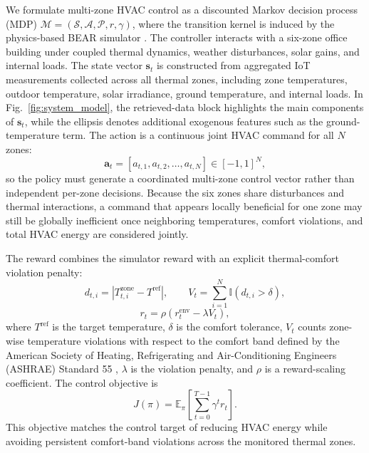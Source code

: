 ﻿\documentclass[conference]{IEEEtran}
\theoremstyle{nonumberplain}
\theoremstyle{plain}
\begin{document}
We formulate multi-zone HVAC control as a discounted Markov decision process (MDP) $\mathcal{M}=(\mathcal{S},\mathcal{A},\mathcal{P},r,\gamma)$, where the transition kernel is induced by the physics-based BEAR simulator \cite{zhang2023bear}. The controller interacts with a six-zone office building under coupled thermal dynamics, weather disturbances, solar gains, and internal loads. The state vector $\mathbf{s}_t$ is constructed from aggregated IoT measurements collected across all thermal zones, including zone temperatures, outdoor temperature, solar irradiance, ground temperature, and internal loads. In Fig.~\ref{fig:system_model}, the retrieved-data block highlights the main components of $\mathbf{s}_t$, while the ellipsis denotes additional exogenous features such as the ground-temperature term. The action is a continuous joint HVAC command for all $N$ zones:
\begin{equation}
    \mathbf{a}_t =
    [a_{t,1}, a_{t,2}, \dots, a_{t,N}]
    \in [-1,1]^N,
    \label{eq:action}
\end{equation}
so the policy must generate a coordinated multi-zone control vector rather than independent per-zone decisions. Because the six zones share disturbances and thermal interactions, a command that appears locally beneficial for one zone may still be globally inefficient once neighboring temperatures, comfort violations, and total HVAC energy are considered jointly.

The reward combines the simulator reward with an explicit thermal-comfort violation penalty:
\begin{equation}
    d_{t,i}=\left|T_{t,i}^{\mathrm{zone}}-T^{\mathrm{ref}}\right|,
    \qquad
    V_t=\sum_{i=1}^{N}\mathbb{I}(d_{t,i}>\delta),
    \label{eq:violation}
\end{equation}
\begin{equation}
    r_t = \rho \left( r_t^{\mathrm{env}} - \lambda V_t \right),
    \label{eq:reward}
\end{equation}
where $T^{\mathrm{ref}}$ is the target temperature, $\delta$ is the comfort tolerance, $V_t$ counts zone-wise temperature violations with respect to the comfort band defined by the American Society of Heating, Refrigerating and Air-Conditioning Engineers (ASHRAE) Standard 55 \cite{standard2023thermal}, $\lambda$ is the violation penalty, and $\rho$ is a reward-scaling coefficient. The control objective is
\begin{equation}
    J(\pi)=\mathbb{E}_{\pi}\left[\sum_{t=0}^{T-1}\gamma^t r_t\right].
    \label{eq:objective}
\end{equation}
This objective matches the control target of reducing HVAC energy while avoiding persistent comfort-band violations across the monitored thermal zones.
\end{document}
